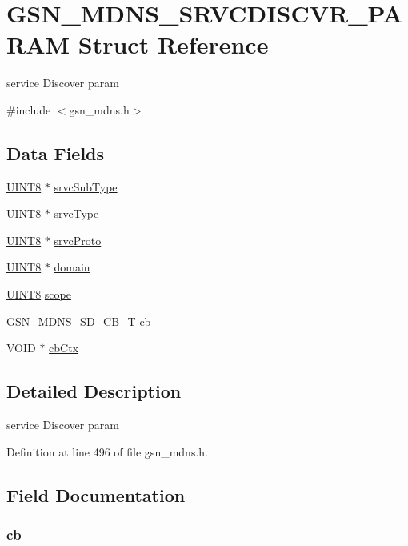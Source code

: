 \hypertarget{a00148}{
\section{GSN\_\-MDNS\_\-SRVCDISCVR\_\-PARAM Struct Reference}
\label{a00148}
}


service Discover param  




{\ttfamily \#include $<$gsn\_\-mdns.h$>$}

\subsection*{Data Fields}
\begin{DoxyCompactItemize}
\item 
\hyperlink{a00660_gab27e9918b538ce9d8ca692479b375b6a}{UINT8} $\ast$ \hyperlink{a00148_a4e61cdbf2eafc75c79bcde6e6c7677f5}{srvcSubType}
\item 
\hyperlink{a00660_gab27e9918b538ce9d8ca692479b375b6a}{UINT8} $\ast$ \hyperlink{a00148_a2e752067434e761ea83939d19aa930fe}{srvcType}
\item 
\hyperlink{a00660_gab27e9918b538ce9d8ca692479b375b6a}{UINT8} $\ast$ \hyperlink{a00148_a77a656b58f941a70bb2885241398ae4f}{srvcProto}
\item 
\hyperlink{a00660_gab27e9918b538ce9d8ca692479b375b6a}{UINT8} $\ast$ \hyperlink{a00148_a3498b70cb998dd924ec4aea5780b9696}{domain}
\item 
\hyperlink{a00660_gab27e9918b538ce9d8ca692479b375b6a}{UINT8} \hyperlink{a00148_aa73cc4a6cdd8178cc27ecbdd515c750c}{scope}
\item 
\hyperlink{a00668_gaef8391be45a1399b7895289b3b56d632}{GSN\_\-MDNS\_\-SD\_\-CB\_\-T} \hyperlink{a00148_a01d247a395cb705f6e9037d660aaa566}{cb}
\item 
VOID $\ast$ \hyperlink{a00148_abc1717c5357c7dda5c2abef096a06f1f}{cbCtx}
\end{DoxyCompactItemize}


\subsection{Detailed Description}
service Discover param 

Definition at line 496 of file gsn\_\-mdns.h.



\subsection{Field Documentation}
\hypertarget{a00148_a01d247a395cb705f6e9037d660aaa566}{
\subsubsection[{cb}]{ {\bf cb}}}
\label{a00148_a01d247a395cb705f6e9037d660aaa566}


